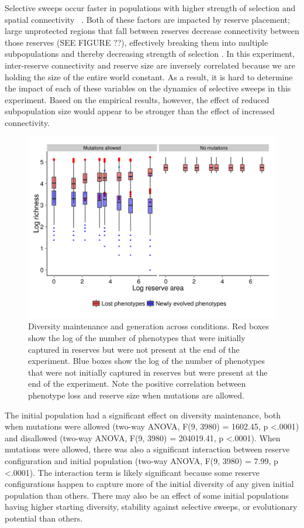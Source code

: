 \documentclass[letterpaper]{article}
\begin{document}
Selective sweeps occur faster in populations with higher strength of selection and spatial connectivity ~\citep{cantu-paz_migration_2001}. Both of these factors are impacted by reserve placement; large unprotected regions that fall between reserves decrease connectivity between those reserves (SEE FIGURE ??), effectively breaking them into multiple subpopulations and thereby decreasing strength of selection \citep{gavrilets_dynamic_2005}. In this experiment,  inter-reserve connectivity and reserve size are inversely correlated because we are holding the size of the entire world constant. As a result, it is hard to determine the impact of each of these variables on the dynamics of selective sweeps in this experiment. Based on the empirical results, however, the effect of reduced subpopulation size would appear to be stronger than the effect  of increased connectivity.
        
\begin{figure}[h]
	\centering
	\includegraphics[]{DiversityGenerationMaintenance.png}
    \caption{Diversity maintenance and generation across conditions. Red boxes show the log of the number of phenotypes that were initially captured in reserves but were not present at the end of the experiment. Blue boxes show the log of the number of phenotypes that were not initially captured in reserves but were present at the end of the experiment. Note the positive correlation between phenotype loss and reserve size when mutations are allowed.}
    \label{fig:diversitygenerationmaintenance}
\end{figure}

The initial population had a significant effect on diversity maintenance, both when mutations were allowed (two-way ANOVA, F(9, 3980) = 1602.45, p \textless .0001) and disallowed  (two-way ANOVA, F(9, 3980) = 204019.41, p \textless .0001). When mutations were allowed, there was also a significant interaction between reserve configuration and initial population (two-way ANOVA, F(9, 3980) = 7.99, p \textless .0001). The interaction term is likely significant because some reserve configurations happen to capture more of the initial diversity of any given initial population than others. There may also be an effect of some initial populations having higher starting diversity, stability against selective sweeps, or evolutionary potential than others. 
        
\end{document}
